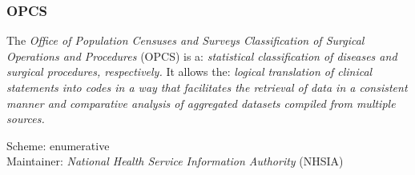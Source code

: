 %
%
%
%
%
%
%

\subsubsection{OPCS}
\label{opcs_heading}

The \emph{Office of Population Censuses and Surveys Classification of Surgical
Operations and Procedures} (OPCS) is a: \textit{statistical classification of
diseases and surgical procedures, respectively.} It allows the: \textit{logical
translation of clinical statements into codes in a way that facilitates the
retrieval of data in a consistent manner and comparative analysis of aggregated
datasets compiled from multiple sources.} \cite{opcs}

Scheme: enumerative\\
Maintainer: \emph{National Health Service Information Authority} (NHSIA)
